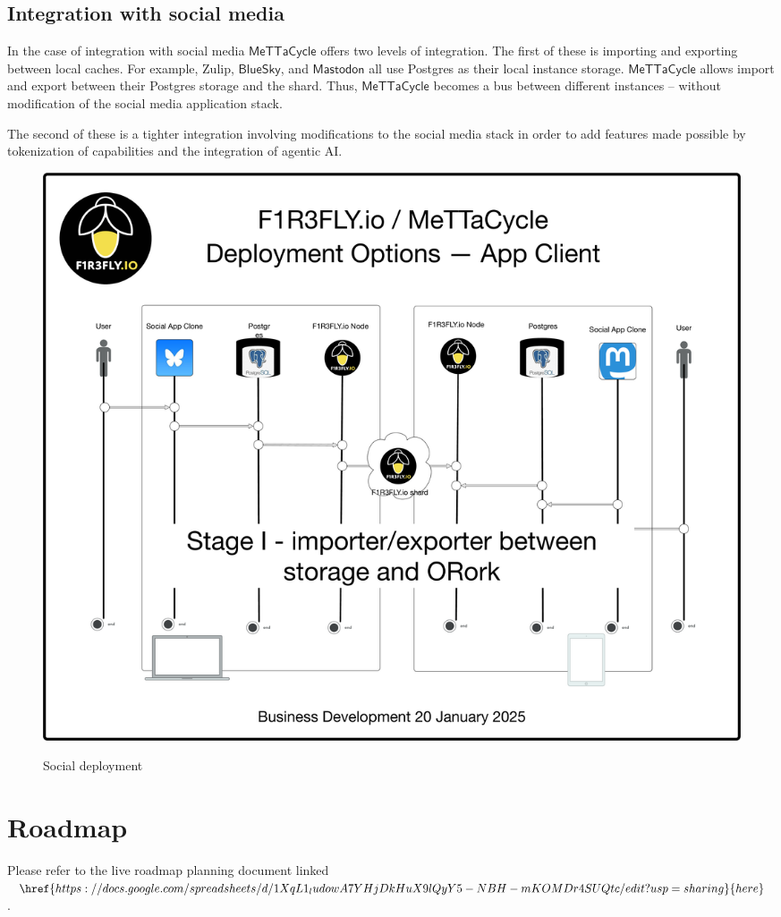 \documentclass{article}
\newcommand{\MC}{\mathsf{MeTTaCycle}}
\begin{document}
\subsection{Integration with social media}

In the case of integration with social media $\MC$ offers two
levels of integration. The first of these is importing and exporting
between local caches. For example, Zulip, $\mathsf{BlueSky}$, and
$\mathsf{Mastodon}$ all use Postgres as their local instance
storage. $\MC$ allows import and export between their Postgres
storage and the shard. Thus, $\MC$ becomes a bus between
different instances -- without modification of the social media
application stack.

The second of these is a tighter integration involving modifications
to the social media stack in order to add features made possible by
tokenization of capabilities and the integration of agentic AI.

\begin{figure}
  \centering
  \includegraphics[scale=0.15]{MeTTaCycleArchitecture2025SocialDeployment.pdf} \\
  \caption{Social deployment}
  \label{MCArch2025SocialDeployment}
\end{figure}

\section{Roadmap}

Please refer to the live roadmap planning document linked $\href{https://docs.google.com/spreadsheets/d/1XqL1_ludowA7YHjDkHuX9lQyY5-NBH-mKOMDr4SUQtc/edit?usp=sharing}{here}$.
\end{document}
